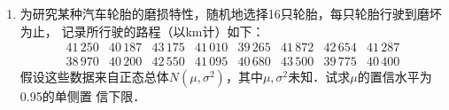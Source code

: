 \begin{enumerate}
\begin{enumerate}
        \item 求第21题中$\mu_1-\mu_2$的置信水平为0.95的单侧置信下限．
        
        {\kaishu 附：第21题为：随机地从$A$批导线中抽4根，又从$B$批导线中抽5根，测得电阻（$\Omega$）为
        \begin{equation}
            \begin{split}
                & A\mbox{批导线：} \quad  0.143 \quad 0.142 \quad 0.143 \quad 0.137\\
                & B\mbox{批导线：} \quad  0.140 \quad 0.142 \quad 0.136 \quad 0.138 \quad 0.140
            \end{split}
            \nonumber
        \end{equation}
        设测定数据分别来自分布$N(\mu_1,\sigma^2),N(\mu_2,\sigma^2)$，且两样本相互独立．\\
        又$\mu_1,\mu_2,\sigma^2$均为未知，
        试求$\mu_1-\mu_2$的置信水平为0.95的置信区间.}

        \item 求第23题中方差比$\sigma_A^2/\sigma_B^2$的置信水平为0.95的单侧置信上限．
        
        {\kaishu 附：第23题为：设两位化验员$A, B$独立地对某种聚合物含氯量用相同的方法各做10次测定．其测
        定值的样本方差依次为$s_A^2=0.5419,s_B^2=0.6065$．设$\sigma_A^2,\sigma_B^2$分别为$A,B$所测定的测定值总体
        的方差.设总体均为正态的，且两样本独立．求方差比$\sigma_A^2/\sigma_B^2$的置信水平为0.95的置信区间．}
    \end{enumerate}




    \item 为研究某种汽车轮胎的磨损特性，随机地选择16只轮胎，每只轮胎行驶到磨坏为止，
    记录所行驶的路程（以km计）如下：
    $$\begin{array}{cccccccc}
        41\, 250 & 40\, 187 & 43\, 175 & 41\, 010 & 39\, 265 & 41\, 872 & 42\, 654 & 41\, 287\\
        38\, 970 & 40\, 200 & 42\, 550 & 41\, 095 & 40\, 680 & 43\, 500 & 39\, 775 & 40\, 400 
    \end{array}$$
    假设这些数据来自正态总体$N(\mu,\sigma^2)$，其中$\mu,\sigma^2$未知．试求$\mu$的置信水平为0.95的单侧置
    信下限．




\end{enumerate}
